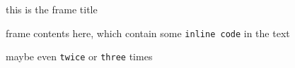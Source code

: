 
\begin{frame}[fragile]{this is the frame title}

    frame contents here, which contain some \verb|inline code| in the text

    maybe even \verb|twice| or \verb|three|  times

\end{frame}